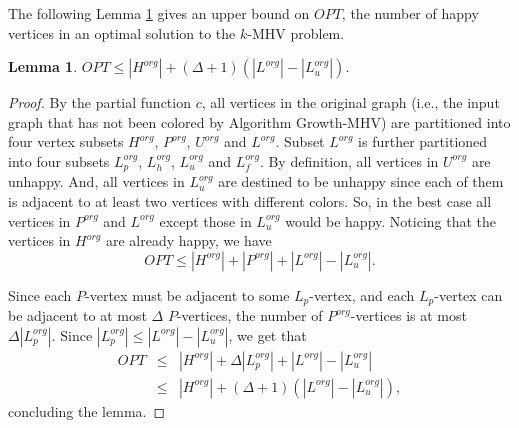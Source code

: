 \documentclass[11pt]{article}
\newtheorem{lemma}{Lemma}[section]
\newcommand{\qed}{\vrule height4pt width4pt depth2pt}
\begin{document}
The following Lemma \ref{lm - upper bound on OPT} gives an upper bound
on $OPT$, the number of happy vertices in an optimal solution to
the $k$-MHV problem.

\begin{lemma}
\label{lm - upper bound on OPT}
$OPT \leq |H^{org}| + (\Delta + 1)(|L^{org}| - |L_{u}^{org}|)$.
\end{lemma}
\begin{proof}
By the partial function $c$, all vertices in the original graph
(i.e., the input graph that has not been colored by Algorithm {\sc Growth-MHV})
are partitioned into four vertex subsets $H^{org}$, $P^{org}$, $U^{org}$
and $L^{org}$. Subset $L^{org}$ is further partitioned into four subsets
$L_p^{org}$, $L_{h}^{org}$, $L_{u}^{org}$ and $L_f^{org}$.
By definition, all vertices in $U^{org}$ are unhappy.
And, all vertices in $L_{u}^{org}$ are destined to be unhappy
since each of them is adjacent to at least two vertices with different
colors. So, in the best case all vertices in $P^{org}$ and $L^{org}$
except those in $L_{u}^{org}$ would be happy.
Noticing that the vertices in $H^{org}$ are already happy, we have
\begin{equation}
OPT \leq |H^{org}| + |P^{org}| + |L^{org}| - |L_{u}^{org}|. \nonumber
\end{equation}

Since each $P$-vertex must be adjacent to some $L_p$-vertex, and each
$L_p$-vertex can be adjacent to at most $\Delta$ $P$-vertices, the number
of $P^{org}$-vertices is at most $\Delta |L_p^{org}|$.
Since $|L_p^{org}| \leq |L^{org}| - |L_{u}^{org}|$, we get that
\begin{eqnarray}
OPT &\leq& |H^{org}| + \Delta |L_p^{org}| + |L^{org}| - |L_{u}^{org}|
\nonumber \\
&\leq& |H^{org}| + (\Delta + 1)(|L^{org}| - |L_{u}^{org}|),
\nonumber
\end{eqnarray}
concluding the lemma.
\qed
\end{proof}
\end{document}
